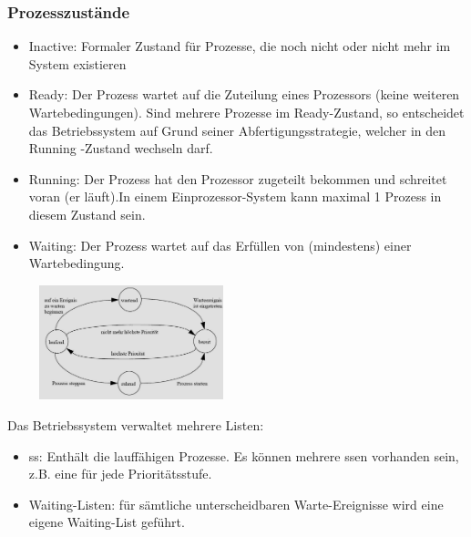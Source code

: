 \subsubsection{Prozesszustände}
\begin{multicols}{2}
\begin{itemize}
    \item Inactive: Formaler Zustand für Prozesse, die noch nicht oder nicht mehr im System existieren
    \item Ready: Der Prozess wartet auf die Zuteilung eines Prozessors (keine weiteren Wartebedingungen). Sind mehrere Prozesse im Ready-Zustand, so entscheidet das Betriebssystem auf Grund seiner Abfertigungsstrategie, welcher in den Running -Zustand wechseln darf. 
    \item Running: Der Prozess hat den Prozessor zugeteilt bekommen und schreitet voran (er läuft).In einem Einprozessor-System kann maximal 1 Prozess in diesem Zustand sein.
    \item Waiting: Der Prozess wartet auf das Erfüllen von (mindestens) einer Wartebedingung.
\end{itemize} \ \ \ \ \
\includegraphics[width=0.4\textwidth]{images/Betriebssysteme/Prozesszustaende.png}
\end{multicols}
Das Betriebssystem verwaltet mehrere Listen:
\begin{itemize}
    \item ss: Enthält die lauffähigen Prozesse. Es können mehrere ssen vorhanden sein, z.B. eine für jede Prioritätsstufe.
    \item Waiting-Listen: für sämtliche unterscheidbaren Warte-Ereignisse wird eine eigene Waiting-List geführt.
\end{itemize}

